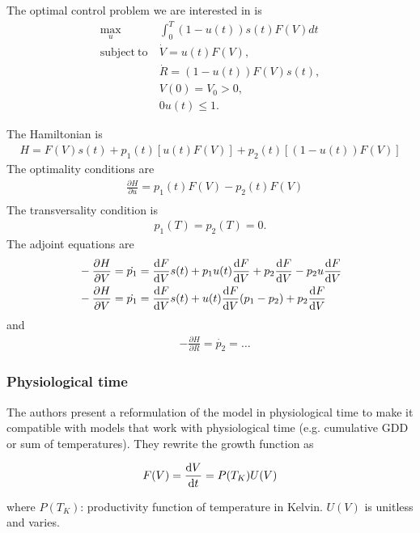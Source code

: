 \documentclass[12pt, oneside]{article}   	%
\begin{document}
The optimal control problem we are interested in is
%
\begin{align}
\max_{u} &  \int_0^T (1-u(t)) s(t)  F(V) dt  \nonumber \\
\mathrm{subject\ to\ } 
& \dot{V} = u(t) F(V) , \nonumber \\
& \dot{R} = (1-u(t)) F(V) s(t) , \nonumber \\ 
& V(0) = V_0 > 0, \nonumber \\
& 0 u(t) \leq 1.  
\end{align}

\noindent The Hamiltonian is 
%
\begin{align}
H = F(V) s(t) + p_1(t) [u(t) F(V)] +  p_2(t) [(1-u(t)) F(V)] 
\end{align}
%
The optimality conditions are
%
\begin{align}
& \frac{\partial H}{\partial u} = p_1(t) F(V) -  p_2(t) F(V) \\
\end{align}
%
The transversality condition is
%
\begin{align}
p_1(T) = p_2(T) = 0.
\end{align}
%
The adjoint equations are
%
\begin{align}
&-\frac{\partial H}{\partial V} = \dot{p_1}  = \dv{F}{V} (V(t)) s(t) + p_1 u(t)  \dv{F}{V} (V(t)) + p_2  \dv{F}{V} (V(t)) - p_2 u  \dv{F}{V} (V(t)) \\
& -\frac{\partial H}{\partial V} = \dot{p_1}  = \dv{F}{V} (V(t)) s(t) + u(t)  \dv{F}{V} (V(t)) (p_1 - p_2) + p_2  \dv{F}{V} (V(t)) 
\end{align}
%
and
\begin{align}
&-\frac{\partial H}{\partial R} = \dot{p_2}  = \dots
\end{align}

\subsubsection{Physiological time}

The authors present a reformulation of the model in physiological time to make it compatible with models that work with physiological time (e.g. cumulative GDD or sum of temperatures). They rewrite the growth function as

\begin{align}
F(V) = \dv{V}{t} = P(T_K) U(V)
\end{align}

where $P(T_K)$: productivity function of temperature in Kelvin. $U(V)$ is unitless and varies. 
\end{document}
